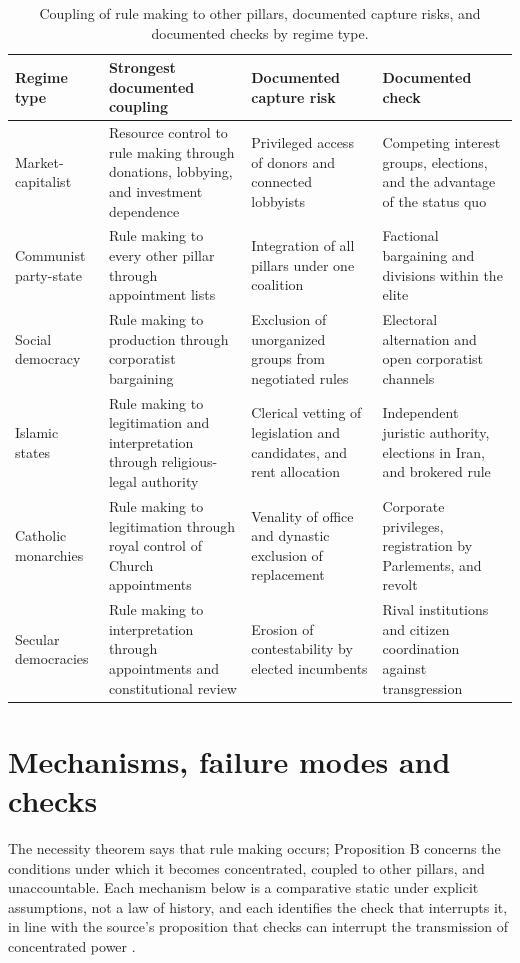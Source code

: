 \documentclass[11pt,letterpaper]{article}
\theoremstyle{definition}
\theoremstyle{remark}
\begin{document}
\begin{table}[tbp]
\centering
\small
\caption{Coupling of rule making to other pillars, documented capture risks, and documented checks by regime type.}
\label{tab:regimes-coupling}
\begin{tabularx}{\textwidth}{@{}L{2.5cm}YYY@{}}
\toprule
Regime type & Strongest documented coupling & Documented capture risk & Documented check \\
\midrule
Market-capitalist & Resource control to rule making through donations, lobbying, and investment dependence & Privileged access of donors and connected lobbyists & Competing interest groups, elections, and the advantage of the status quo \\
Communist party-state & Rule making to every other pillar through appointment lists & Integration of all pillars under one coalition & Factional bargaining and divisions within the elite \\
Social democracy & Rule making to production through corporatist bargaining & Exclusion of unorganized groups from negotiated rules & Electoral alternation and open corporatist channels \\
Islamic states & Rule making to legitimation and interpretation through religious-legal authority & Clerical vetting of legislation and candidates, and rent allocation & Independent juristic authority, elections in Iran, and brokered rule \\
Catholic monarchies & Rule making to legitimation through royal control of Church appointments & Venality of office and dynastic exclusion of replacement & Corporate privileges, registration by Parlements, and revolt \\
Secular democracies & Rule making to interpretation through appointments and constitutional review & Erosion of contestability by elected incumbents & Rival institutions and citizen coordination against transgression \\
\bottomrule
\end{tabularx}
\end{table}

\section{Mechanisms, failure modes and checks}
\label{sec:mechanisms}

The necessity theorem says that rule making occurs; Proposition B concerns the conditions under which it becomes concentrated, coupled to other pillars, and unaccountable. Each mechanism below is a comparative static under explicit assumptions, not a law of history, and each identifies the check that interrupts it, in line with the source's proposition that checks can interrupt the transmission of concentrated power \citep[Proposition~2]{largo2026hbs}.
\end{document}
